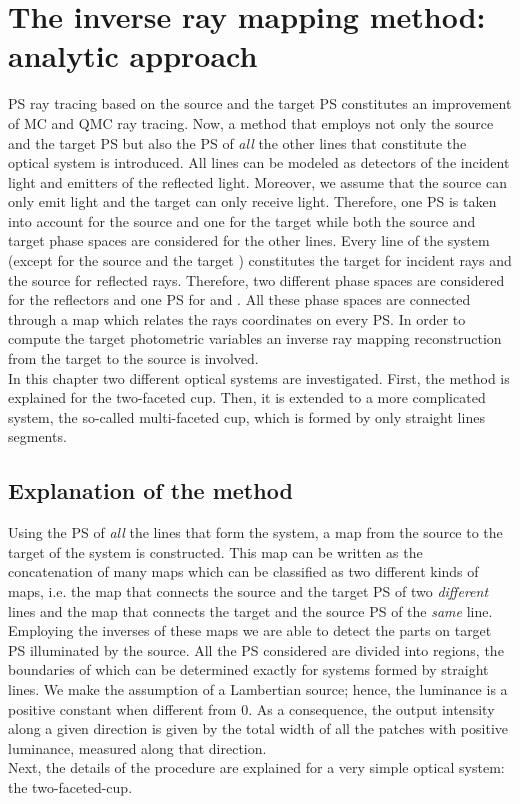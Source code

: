 \chapter{The inverse ray mapping method: analytic approach}\label{chap:raymapping1}
PS ray tracing based on the source and the target PS constitutes an improvement of MC and QMC ray tracing. 
Now, a method that employs not only the source and the target PS but also the PS of \textit{all} the other lines that constitute the optical system is introduced. %
All lines can be modeled as detectors of the incident light and emitters of the reflected light.
Moreover, we assume that the source can only emit light and the target can only receive light.
Therefore, one PS is taken into account for the source and one for the target while both the source and target phase spaces are considered for the other lines. Every line of the system (except for the source  and the target ) constitutes
the target for incident rays and the source for reflected rays. Therefore, two different phase spaces are considered for the reflectors and one PS for
 and . All these phase spaces are connected through a map which relates the rays coordinates on every PS. In order to compute the target photometric variables an inverse ray mapping reconstruction from the target to the source is involved.
\\\indent
In this chapter two different optical systems are investigated.
First, the method is explained for the two-faceted cup. 
Then, it is extended to a more complicated system, the so-called multi-faceted cup, which is formed by only straight lines segments.
\section{Explanation of the method}
Using the PS of \textit{all} the lines that form the system, a map from the source to the target of the system is constructed. This map can be written as the concatenation of many maps which
can be classified as two different kinds of maps, i.e. the map that connects the source and the target PS of two \textit{different} lines and the map that connects the target and the source PS of the \textit{same} line.
Employing the inverses of these maps we are able to detect the parts on target PS illuminated by the source.
All the PS considered are divided into regions, the boundaries of which can be determined exactly for systems formed by straight lines.
We make the assumption of a Lambertian source; hence, the luminance is a positive constant when different from $0$. 
As a consequence, the output intensity along a given direction is given by the total width of all the patches with positive luminance, measured along that direction.\\ \indent Next, the details of the procedure are explained for a very simple optical system: the two-faceted-cup.
